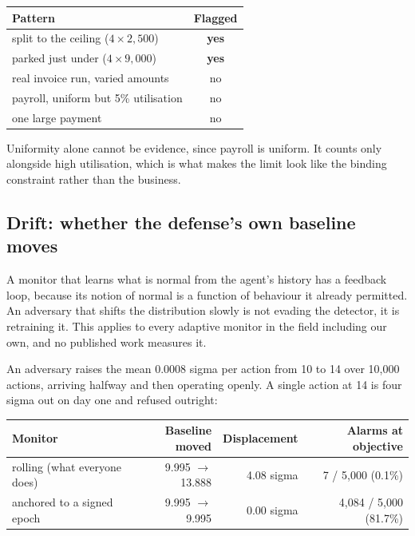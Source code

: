 \documentclass[11pt]{article}
\begin{document}
\begin{center}
\small
\begin{tabular}{@{}lc@{}}
\toprule
\textbf{Pattern} & \textbf{Flagged} \\
\midrule
split to the ceiling ($4 \times 2{,}500$) & \textbf{yes} \\
parked just under ($4 \times 9{,}000$) & \textbf{yes} \\
real invoice run, varied amounts & no \\
payroll, uniform but 5\% utilisation & no \\
one large payment & no \\
\bottomrule
\end{tabular}
\end{center}

Uniformity alone cannot be evidence, since payroll is uniform. It counts only
alongside high utilisation, which is what makes the limit look like the binding
constraint rather than the business.

\subsection{Drift: whether the defense's own baseline moves}

A monitor that learns what is normal from the agent's history has a feedback
loop, because its notion of normal is a function of behaviour it already
permitted. An adversary that shifts the distribution slowly is not evading the
detector, it is retraining it. This applies to every adaptive monitor in the
field including our own, and no published work measures it.

An adversary raises the mean 0.0008 sigma per action from 10 to 14 over 10,000
actions, arriving halfway and then operating openly. A single action at 14 is
four sigma out on day one and refused outright:

\begin{center}
\small
\begin{tabular}{@{}lrrr@{}}
\toprule
\textbf{Monitor} & \textbf{Baseline moved} & \textbf{Displacement} & \textbf{Alarms at objective} \\
\midrule
rolling (what everyone does) & 9.995 $\rightarrow$ 13.888 & 4.08 sigma & 7 / 5{,}000 (0.1\%) \\
anchored to a signed epoch & 9.995 $\rightarrow$ 9.995 & 0.00 sigma & 4{,}084 / 5{,}000 (81.7\%) \\
\bottomrule
\end{tabular}
\end{center}
\end{document}
